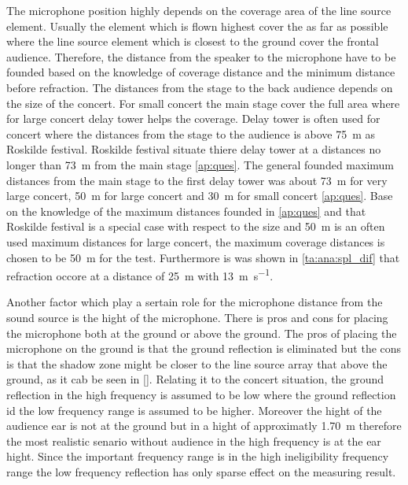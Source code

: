The microphone position highly depends on the coverage area of the line source element. Usually the element which is flown highest cover the as far as possible where the line source element which is closest to the ground cover the frontal audience. Therefore, the distance from the speaker to the microphone have to be founded based on the knowledge of coverage distance and the minimum distance before refraction. The distances from the stage to the back audience depends on the size of the concert. For small concert the main stage cover the full area where for large concert delay tower helps the coverage. Delay tower is often used for concert where the distances from the stage to the audience is above \SI{75}{\meter} as Roskilde festival. Roskilde festival situate thiere delay tower at a distances no longer than \SI{73}{\meter} from the main stage \autoref{ap:ques}. The general founded maximum distances from the main stage to the first delay tower was about \SI{73}{\meter} for very large concert, \SI{50}{\meter} for large concert and \SI{30}{\meter} for small concert \autoref{ap:ques}. Base on the knowledge of the maximum distances founded in \autoref{ap:ques} and that Roskilde festival is a special case with respect to the size and \SI{50}{\meter} is an often used maximum distances for large concert, the maximum coverage distances is chosen to be \SI{50}{\meter} for the test. Furthermore is was shown in \autoref{ta:ana:spl_dif} that refraction occore at a distance of \SI{25}{\meter} with \SI{13}{\meter\per\second}.

Another factor which play a sertain role for the microphone distance from the sound source is the hight of the microphone. There is pros and cons for placing the microphone both at the ground or above the ground. The pros of placing the microphone on the ground is that the ground reflection is eliminated but the cons is that the shadow zone might be closer to the line source array that above the ground, as it cab be seen in \autoref{}. Relating it to the concert situation, the ground reflection in the high frequency is assumed to be low where the ground reflection id the low frequency range is assumed to be higher. Moreover the hight of the audience ear is not at the ground but in a hight of approximatly \SI{1.70}{\meter} therefore the most realistic senario without audience in the high frequency is at the ear hight. Since the important frequency range is in the high ineligibility frequency range the low frequency reflection has only sparse effect on the measuring result. 


